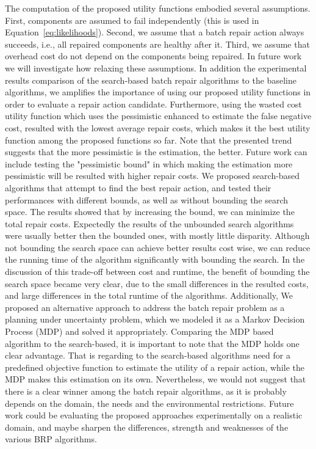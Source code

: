 \documentclass[a4paper,11pt]{report}
\begin{document}
The computation of the proposed utility functions embodied several assumptions. First, components are assumed to fail independently (this is used in Equation~\ref{eq:likelihoods}). Second, we assume that a batch repair action always succeeds, i.e., all repaired components are healthy after it. Third, we assume that overhead cost do not depend on the components being repaired. In future work we will investigate how relaxing these assumptions.
In addition the experimental results comparison of the search-based batch repair algorithms to the baseline algorithms, we amplifies the importance of using our proposed utility functions in order to evaluate a repair action candidate. Furthermore, using the wasted cost utility function which uses the pessimistic enhanced to estimate the false negative cost, resulted with the lowest average repair costs, which makes it the best utility function among the proposed functions so far. Note that the presented trend suggests that the more pessimistic is the estimation, the better. Future work can include testing the "pessimistic bound" in which making the estimation more pessimistic will be resulted with higher repair costs. 
We proposed search-based algorithms that attempt to find the best repair action, and tested their performances with different bounds, as well as without bounding the search space. The results showed that by increasing the bound, we can minimize the total repair costs. Expectedly the results of the unbounded search algorithms were usually better then the bounded ones, with mostly little disparity. Although not bounding the search space can achieve better results cost wise, we can reduce the running time of the algorithm significantly with bounding the search. In the discussion of this trade-off between cost and runtime, the benefit of bounding the search space became very clear, due to the small differences in the resulted costs, and large differences in the total runtime of the algorithms. 
Additionally, We proposed an alternative approach to address the batch repair problem as a planning under uncertainty problem, which we modeled it as a Markov Decision Process (MDP) and solved it appropriately. Comparing the MDP based algorithm to the search-based, it is important to note that the MDP holds one clear advantage. That is regarding to the search-based algorithms need for a predefined objective function to estimate the utility of a repair action, while the MDP makes this estimation on its own.
Nevertheless, we would not suggest that there is a clear winner among the batch repair algorithms, as it is probably depends on the domain, the needs and the environmental restrictions.
Future work could be evaluating the proposed approaches experimentally on a realistic domain, and maybe sharpen the differences, strength and weaknesses of the various BRP algorithms.





\end{document}
